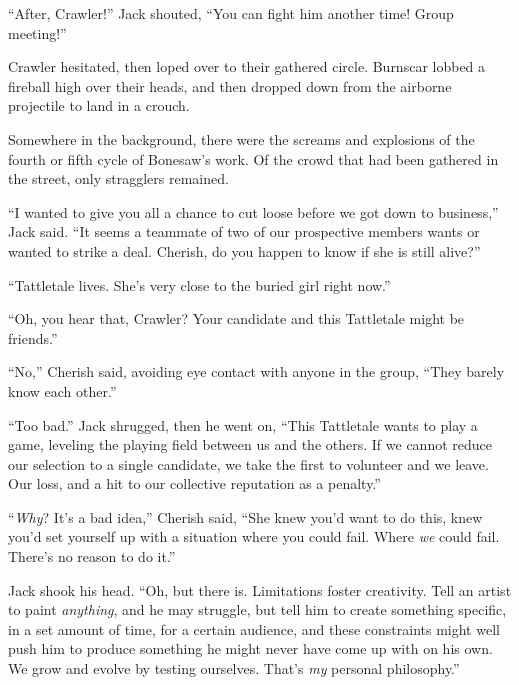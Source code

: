 ``After, Crawler!''  Jack shouted, ``You can fight him another time!  Group meeting!''



Crawler hesitated, then loped over to their gathered circle.  Burnscar lobbed a fireball high over their heads, and then dropped down from the airborne projectile to land in a crouch.



Somewhere in the background, there were the screams and explosions of the fourth or fifth cycle of Bonesaw's work.  Of the crowd that had been gathered in the street, only stragglers remained.



``I wanted to give you all a chance to cut loose before we got down to business,'' Jack said.  ``It seems a teammate of two of our prospective members wants or wanted to strike a deal.  Cherish, do you happen to know if she is still alive?''



``Tattletale lives.  She's very close to the buried girl right now.''



``Oh, you hear that, Crawler?  Your candidate and this Tattletale might be friends.''



``No,'' Cherish said, avoiding eye contact with anyone in the group, ``They barely know each other.''



``Too bad.'' Jack shrugged, then he went on, ``This Tattletale wants to play a game, leveling the playing field between us and the others.  If we cannot reduce our selection to a single candidate, we take the first to volunteer and we leave.  Our loss, and a hit to our collective reputation as a penalty.''



``\emph{Why}?  It's a bad idea,'' Cherish said, ``She knew you'd want to do this, knew you'd set yourself up with a situation where you could fail.  Where \emph{we} could fail.  There's no reason to do it.''



Jack shook his head.  ``Oh, but there is.  Limitations foster creativity.  Tell an artist to paint \emph{anything}, and he may struggle, but tell him to create something specific, in a set amount of time, for a certain audience, and these constraints might well push him to produce something he might never have come up with on his own.  We grow and evolve by testing ourselves.  That's \emph{my} personal philosophy.''



